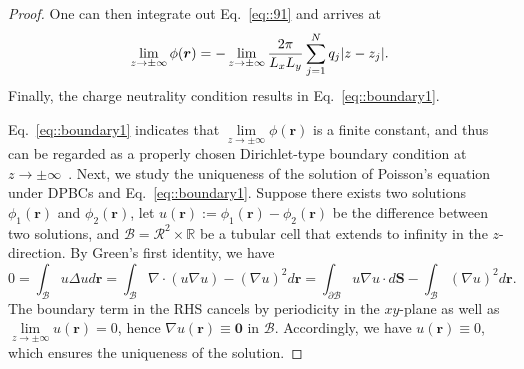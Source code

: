 \begin{proof}
	One can then integrate out Eq.~\eqref{eq::91} and arrives at
	\begin{equation}\label{eq::boundary2}
		\lim_{z \to \pm \infty} \phi(\bm{r}) = -\lim_{z \to \pm \infty} \frac{2\pi}{L_x L_y} \sum_{j = 1}^N q_j \lvert z - z_j\rvert.
	\end{equation}
	Finally, the charge neutrality condition results in Eq.~\eqref{eq::boundary1}. 
 
Eq.~\eqref{eq::boundary1} indicates that $\lim\limits_{z \to \pm \infty} \phi(\bm{r})$ is a finite constant, and thus can be regarded as a properly chosen Dirichlet-type boundary condition at $z\rightarrow\pm\infty$~\cite{lindbo2012fast}. 
Next, we study the uniqueness of the solution of Poisson's equation under DPBCs and Eq.~\eqref{eq::boundary1}. Suppose there exists two solutions $\phi_1(\bm{r})$ and $\phi_2(\bm{r})$,
let $u(\bm{r}):=\phi_1(\bm{r})-\phi_2(\bm{r})$ be the difference between two solutions, and $\mathcal{B}=\mathcal{R}^2\times\mathbb{R}$ be a tubular cell that extends to infinity in the $z$-direction. By Green's first identity, we have 
\begin{equation}
0=\int_{\mathcal{B}}u\Delta ud\bm{r}=\int_{\mathcal{B}}\nabla\cdot(u\nabla u)-(\nabla u)^2d\bm{r}=\int_{\partial\mathcal{B}}u\nabla u\cdot d\bm{S}-\int_{\mathcal{B}}\left(\nabla u\right)^2d\bm{r}.
\end{equation}
The boundary term in the RHS cancels by periodicity in the $xy$-plane as well as $\lim\limits_{z\rightarrow\pm\infty}u(\bm{r})=0$, hence $\nabla u(\bm{r})\equiv \bm{0}$ in $\mathcal{B}$. Accordingly, we have $u(\bm{r})\equiv 0$, which ensures the uniqueness of the solution.
  
\end{proof}


